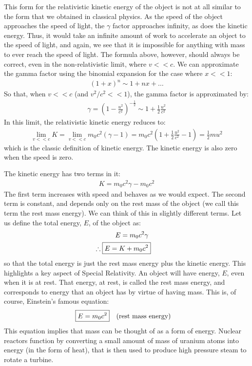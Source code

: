 This form for the relativistic kinetic energy of the object is not at all similar to the form that we obtained in classical physics. As the speed of the object approaches the speed of light, the $\gamma$ factor approaches infinity, as does the kinetic energy. Thus, it would take an infinite amount of work to accelerate an object to the speed of light, and again, we see that it is impossible for anything with mass to ever reach the speed of light. The formula above, however, should always be correct, even in the non-relativistic limit, where $v<<c$. We can approximate the gamma factor using the binomial expansion for the case where $x<<1$:
\begin{align*}
(1+x)^n\sim 1 + nx +\dots 
\end{align*}
So that, when $v<<c$ (and $v^2/c^2<<1$), the gamma factor is approximated by:
\begin{align*}
\gamma=\left(1-\frac{u^2}{c^2}\right)^{-\frac{1}{2}}\sim 1+\frac{1}{2}\frac{u^2}{c^2}
\end{align*}
In this limit, the relativistic kinetic energy reduces to:
\begin{align*}
\lim_{v<<c}K=\lim_{v<<c}m_0c^2(\gamma -1)=m_0c^2\left(1+\frac{1}{2}\frac{u^2}{c^2} - 1  \right)=\frac{1}{2}mu^2
\end{align*}
which is the classic definition of kinetic energy. The kinetic energy is also zero when the speed is zero.

The kinetic energy has two terms in it:
\begin{align*}
K=m_0c^2\gamma -m_0c^2
\end{align*}
The first term increases with speed and behaves as we would expect. The second term is constant, and depends only on the rest mass of the object (we call this term the rest mass energy). We can think of this in slightly different terms. Let us define the total energy, $E$, of the object as:
\begin{align*}
E=m_0c^2\gamma\\
\therefore \;\Aboxed{E = K+m_0c^2}
\end{align*}
so that the total energy is just the rest mass energy plus the kinetic energy. This highlights a key aspect of Special Relativity. An object will have energy, $E$, even when it is at rest. That energy, at rest, is called the rest mass energy, and corresponds to energy that an object has by virtue of having mass. This is, of course, Einstein's famous equation:
\begin{align*}
\Aboxed{E=m_0c^2}\quad \text{(rest mass energy)}
\end{align*}
This equation implies that mass can be thought of as a form of energy. Nuclear reactors function by converting a small amount of mass of uranium atoms into energy (in the form of heat), that is then used to produce high pressure steam to rotate a turbine.


